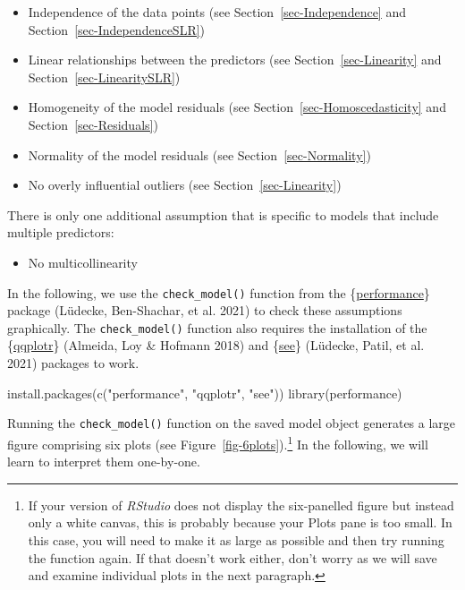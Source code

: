 \documentclass[
  letterpaper,
  DIV=11,
  numbers=noendperiod]{scrreprt}
\newenvironment{Shaded}{\begin{snugshade}}{\end{snugshade}}
\newcommand{\FunctionTok}[1]{\textcolor[rgb]{0.28,0.35,0.67}{#1}}
\newcommand{\NormalTok}[1]{\textcolor[rgb]{0.00,0.23,0.31}{#1}}
\newcommand{\StringTok}[1]{\textcolor[rgb]{0.13,0.47,0.30}{#1}}
\providecommand{\tightlist}{%
  \setlength{\itemsep}{0pt}\setlength{\parskip}{0pt}}
\begin{document}
\begin{itemize}
\tightlist
\item
  Independence of the data points (see Section~\ref{sec-Independence}
  and Section~\ref{sec-IndependenceSLR})
\item
  Linear relationships between the predictors (see
  Section~\ref{sec-Linearity} and Section~\ref{sec-LinearitySLR})
\item
  Homogeneity of the model residuals (see
  Section~\ref{sec-Homoscedasticity} and Section~\ref{sec-Residuals})
\item
  Normality of the model residuals (see Section~\ref{sec-Normality})
\item
  No overly influential outliers (see Section~\ref{sec-Linearity})
\end{itemize}

There is only one additional assumption that is specific to models that
include multiple predictors:

\begin{itemize}
\tightlist
\item
  No multicollinearity
\end{itemize}

In the following, we use the \texttt{check\_model()} function from the
\{\href{https://easystats.github.io/performance}{performance}\} package
(Lüdecke, Ben-Shachar, et al. 2021) to check these assumptions
graphically. The \texttt{check\_model()} function also requires the
installation of the
\{\href{https://aloy.github.io/qqplotr/index.html}{qqplotr}\} (Almeida,
Loy \& Hofmann 2018) and
\{\href{https://easystats.github.io/see/}{see}\} (Lüdecke, Patil, et al.
2021) packages to work.

\begin{Shaded}
\begin{Highlighting}[]
\FunctionTok{install.packages}\NormalTok{(}\FunctionTok{c}\NormalTok{(}\StringTok{"performance"}\NormalTok{, }\StringTok{"qqplotr"}\NormalTok{, }\StringTok{"see"}\NormalTok{))}
\FunctionTok{library}\NormalTok{(performance)}
\end{Highlighting}
\end{Shaded}

Running the \texttt{check\_model()} function on the saved model object
generates a large figure comprising six plots (see
Figure~\ref{fig-6plots}).\footnote{If your version of \emph{RStudio}
  does not display the six-panelled figure but instead only a white
  canvas, this is probably because your Plots pane is too small. In this
  case, you will need to make it as large as possible and then try
  running the function again. If that doesn't work either, don't worry
  as we will save and examine individual plots in the next paragraph.}
In the following, we will learn to interpret them one-by-one.
\end{document}
